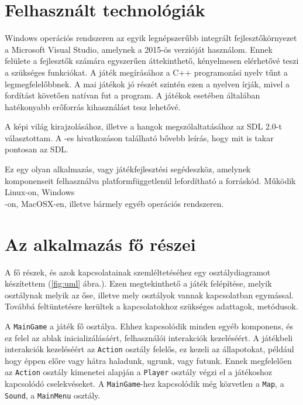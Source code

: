 \label{Chap:komponensek}

\section{Felhasznált technológiák}

Windows operációs rendszeren az egyik legnépszerűbb integrált fejlesztőkörnyezet a Microsoft Visual Studio, amelynek a 2015-ös verzióját használom. Ennek felülete a fejlesztők számára egyszerűen áttekinthető, kényelmesen elérhetővé teszi a szükséges funkciókat. A játék megírásához a C++ programozási nyelv tűnt a legmegfelelőbbnek. A mai játékok jó részét szintén ezen a nyelven írják, mivel a fordítást követően natívan fut a program. A játékok esetében általában hatékonyabb erőforrás kihasználást tesz lehetővé.

A képi világ kirajzolásához, illetve a hangok megszólaltatásához az SDL 2.0-t választottam. A \cite{SDL}-es hivatkozáson található bővebb leírás, hogy mit is takar pontosan az SDL.

Ez egy olyan alkalmazás, vagy játékfejlesztési segédeszköz, amelynek komponenseit felhasználva platformfüggetlenül lefordítható a forráskód. Működik Linux-on, Windows\\-on, MacOSX-en, illetve bármely egyéb operációs rendszeren.

\section{Az alkalmazás fő részei}

A fő részek, és azok kapcsolatainak szemléltetéséhez egy osztálydiagramot készítettem (\ref{fig:uml} ábra.). Ezen megtekinthető a játék felépítése, melyik osztálynak melyik az őse, illetve mely osztályok vannak kapcsolatban egymással. Továbbá feltüntetésre kerültek a kapcsolatokhoz szükséges adattagok, metódusok.

A \texttt{MainGame} a játék fő osztálya. Ehhez kapcsolódik minden egyéb komponens, és ez felel az ablak inicializálásáért, felhasználói interakciók kezeléséért. A játékbeli interakciók kezeléséért az \texttt{Action} osztály felelős, ez kezeli az állapotokat, például hogy éppen előre vagy hátra haladunk, ugrunk, vagy futunk. Ennek megfelelően az \texttt{Action} osztály kimenetei alapján a \texttt{Player} osztály végzi el a játékoshoz kapcsolódó cselekvéseket. A \texttt{MainGame}-hez kapcsolódik még közvetlen a \texttt{Map}, a \texttt{Sound}, a \texttt{MainMenu} osztály. 

